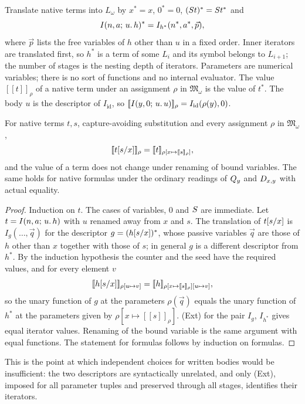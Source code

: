 Translate native terms into $L_\omega$ by $x^{*}=x$, $0^{*}=0$,
$(S t)^{*}=S t^{*}$ and
\[
I(n,a;\,u.\,h)^{*}=I_{h^{*}}(n^{*},a^{*},\vec p),
\]
where $\vec p$ lists the free variables of $h$ other than $u$ in a fixed order.
Inner iterators are translated first, so $h^{*}$ is a term of some $L_i$ and
its symbol belongs to $L_{i+1}$; the number of stages is the nesting depth of
iterators. Parameters are numerical variables; there is no sort of functions
and no internal evaluator. The value $[\![t]\!]_\rho$ of a native term under an
assignment $\rho$ in $\mathfrak{M}_\omega$ is the value of $t^{*}$. The body
$u$ is the descriptor of $I_{\mathrm{id}}$, so
$[\![I(y,0;\,u.\,u)]\!]_\rho=I_{\mathrm{id}}(\rho(y),0)$. %

\begin{lemma}[Substitution]
\label{obs:lem:pi-subst}
For native terms $t,s$, capture-avoiding substitution and every assignment
$\rho$ in $\mathfrak{M}_\omega$,
\[
[\![t[s/x]]\!]_\rho=[\![t]\!]_{\rho[x\mapsto[\![s]\!]_\rho]},
\]
and the value of a term does not change under renaming of bound variables.
The same holds for native formulas under the ordinary readings of
$Q_{y}$ and $D_{x,y}$ with actual equality.
\end{lemma}

\begin{proof}
Induction on $t$. The cases of variables, $0$ and $S$ are immediate. Let
$t=I(n,a;\,u.\,h)$ with $u$ renamed away from $x$ and $s$. The translation of
$t[s/x]$ is $I_{g}(\dots,\vec q)$ for the descriptor
$g=(h[s/x])^{*}$, whose passive variables $\vec q$ are those of $h$
other than $x$ together with those of $s$; in general $g$ is a different
descriptor from $h^{*}$. By the induction hypothesis the counter and the seed
have the required values, and for every element $v$
\[
[\![h[s/x]]\!]_{\rho[u\mapsto v]}=[\![h]\!]_{\rho[x\mapsto[\![s]\!]_\rho][u\mapsto v]},
\]
so the unary function of $g$ at the parameters $\rho(\vec q)$ equals the unary
function of $h^{*}$ at the parameters given by
$\rho[x\mapsto[\![s]\!]_\rho]$. (Ext) for the pair $I_g$, $I_{h^{*}}$ gives
equal iterator values. Renaming of the bound variable is the same argument
with equal functions. The statement for formulas follows by induction on
formulas.
\end{proof}

This is the point at which independent choices for written bodies would be
insufficient: the two descriptors are syntactically unrelated, and only (Ext),
imposed for all parameter tuples and preserved through all stages, identifies
their iterators.

